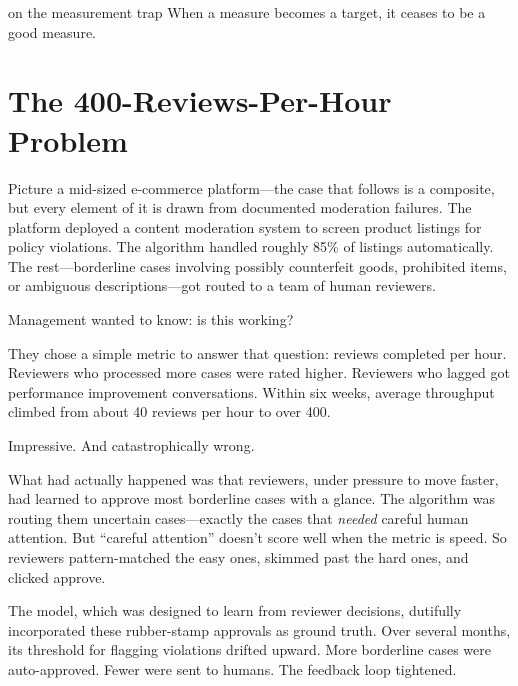 
\label{chap:ch12}
\begin{chapterquote}{on the measurement trap}
When a measure becomes a target, it ceases to be a good measure.
\end{chapterquote}

\section{The 400-Reviews-Per-Hour Problem}

Picture a mid-sized e-commerce platform---the case that follows is a composite, but every element of it is drawn from documented moderation failures. The platform deployed a content moderation system to screen product listings for policy violations. The algorithm handled roughly 85\% of listings automatically. The rest---borderline cases involving possibly counterfeit goods, prohibited items, or ambiguous descriptions---got routed to a team of human reviewers.

Management wanted to know: is this working?

They chose a simple metric to answer that question: reviews completed per hour. Reviewers who processed more cases were rated higher. Reviewers who lagged got performance improvement conversations. Within six weeks, average throughput climbed from about 40 reviews per hour to over 400.

Impressive. And catastrophically wrong.

What had actually happened was that reviewers, under pressure to move faster, had learned to approve most borderline cases with a glance. The algorithm was routing them uncertain cases---exactly the cases that \emph{needed} careful human attention. But ``careful attention'' doesn't score well when the metric is speed. So reviewers pattern-matched the easy ones, skimmed past the hard ones, and clicked approve.

The model, which was designed to learn from reviewer decisions, dutifully incorporated these rubber-stamp approvals as ground truth. Over several months, its threshold for flagging violations drifted upward. More borderline cases were auto-approved. Fewer were sent to humans. The feedback loop tightened.

